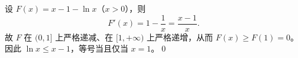 设 $F(x)=x-1-\ln x$（$x>0$），则
\[
F'(x)=1-\frac1x=\frac{x-1}{x}.
\]
故 $F$ 在 $(0,1]$ 上严格递减、在 $[1,+\infty)$ 上严格递增，从而 $F(x)\ge F(1)=0$。
因此 $\boxed{\ln x\le x-1}$，等号当且仅当 $x=1$。\qed

